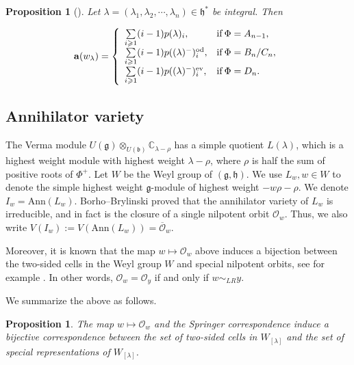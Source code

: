 \documentclass[reqno,12pt]{amsart}
\numberwithin{equation}{section}
\theoremstyle{plain}
\newtheorem{Prop}[Thm]{Proposition}
\theoremstyle{definition}
\newcommand{\Ann}{\mathrm{Ann}}
\newcommand{\aff}{ \mathbf{a} }
\newcommand{\gest}{\geqslant}
\begin{document}
	\begin{Prop}[{\cite[Thm. 1.5]{BXX}}]\label{integral}
		Let $\lambda=(\lambda_1, \lambda_2, \cdots, \lambda_n)\in \mathfrak{h}^*$ be  integral. Then
		
		\[	\aff(w_{\lambda})=\left\{
		\begin{array}{ll}
		\sum\limits_{i\gest 1}(i-1)p(\lambda)_i, &\textnormal{if}\:\Phi =A_{n-1},\\
        \sum\limits_{i\gest 1}(i-1)p((\lambda)^-)_i^{\rm od}, &\textnormal{if}\:\Phi=B_{n}/C_n,\\
		\sum\limits_{i\gest 1}(i-1)p((\lambda)^-)_i^{\rm ev}, &\textnormal{if}\:\Phi=D_{n}.
		\end{array}	
		\right.
		\]	

  
	\end{Prop}



\subsection{Annihilator variety}

 The Verma module $U(\mathfrak{g})\otimes_{U(\mathfrak{b})} \mathbb{C}_{\lambda-\rho}$
has a simple quotient  $L(\lambda)$, which is a highest weight module with highest weight $\lambda-\rho$, where $\rho$ is half the sum of positive roots of $\Phi^+$. 
Let $W$ be the Weyl group of $(\mathfrak{g}, \mathfrak{h})$.  We use $L_w, w\in W$ to denote the simple highest weight $\mathfrak{g}$-module of highest weight $-w\rho-\rho$.  We denote $I_w=\Ann(L_w)$.  Borho--Brylinski \cite{BoB1} proved that the annihilator variety of $L_w$ is irreducible, and in fact is the closure of a single nilpotent orbit $\mathcal{O}_w$. Thus, we also write  $V(I_w):= V(\Ann (L_w))=\overline{\mathcal{O}}_w$.
	

Moreover, it is known that the map $w\mapsto \mathcal{O}_w$ above induces a bijection between the two-sided cells in the Weyl group $W$ and special nilpotent orbits, see for example \cite{BarV82, BoB1, Ta}. In other words, $\mathcal{O}_w=\mathcal{O}_y$ if and only if $w\sim_{LR}y$. 
  
We summarize the above as follows.

\begin{Prop} \label{intehral-W}
The map $w\mapsto \mathcal{O}_w$ and the Springer correspondence induce a bijective correspondence between the set of two-sided cells in $W_{[\lambda]}$ and the set  of special representations of $W_{[\lambda]}$.
	\end{Prop}
    
\end{document}
